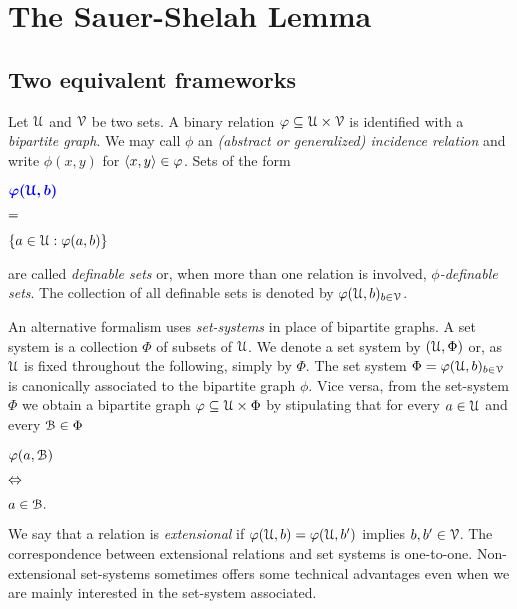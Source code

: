 \documentclass[sputnik.tex]{subfiles}
\begin{document}
\chapter{The Sauer-Shelah Lemma}
\label{sauer}

\def\vc{{\footnotesize VC}}
\def\nip{{\footnotesize NIP}}


\def\medrel#1{\parbox[t]{6ex}{$\displaystyle\hfil #1$}}
\def\ceq#1#2#3{\parbox[t]{25ex}{$\displaystyle #1$}\medrel{#2}{$\displaystyle #3$}}

\def\mr{\color{brown}}
\def\gr{\color{green}}

\def\separatore{\hfil o \rule[0.5ex]{4ex}{0.1ex} o \rule[0.5ex]{4ex}{0.1ex} o}

\section{Two equivalent frameworks}\label{vc_dimension}

Let $\EuScript U$ and $\EuScript V$ be two sets. 
A binary relation $\varphi\subseteq \EuScript U\times\EuScript V$ is identified with a \emph{bipartite graph}.
We may call $\phi$ an \emph{(abstract or generalized) incidence relation\/} and write $\phi(x,y)$ for $\langle x,y\rangle\in\varphi$.
Sets of the form

\ceq{\hfill\emph{$\phi(\U,b)$}}{=}{\{a\in\U:\phi(a,b)\}}

are called \emph{definable sets\/} or, when more than one relation is involved, \emph{$\phi$-definable sets}.
The collection of all definable sets is denoted by \emph{$\varphi(\EuScript U,b)_{b\in\EuScript V}$}.

An alternative formalism uses \emph{set-systems\/} in place of bipartite graphs.
A set system is a collection $\Phi$ of subsets of $\EuScript U$.
We denote a set system by \emph{$(\EuScript U,\Phi)$} or, as $\EuScript U$ is fixed throughout the following, simply by \emph{$\Phi$}.
The set system $\Phi=\varphi(\EuScript U,b)_{b\in\EuScript V}$ is canonically associated to the bipartite graph $\phi$.
Vice versa, from the set-system $\Phi$ we obtain a bipartite graph $\varphi\subseteq\EuScript U\times\Phi$ by stipulating that for every $a\in\EuScript U$ and every $\EuScript B\in\Phi$ 

\ceq{\hfill\phi(a,\B)}{\IFF}{a\in\B.}

We say that a relation is \emph{extensional\/} if $\varphi(\EuScript U,b)=\varphi(\EuScript U,b')$ implies $b,b'\in\EuScript V$.
The correspondence between extensional relations and set systems is one-to-one.
Non-extensional set-systems sometimes offers some technical advantages even when we are mainly interested in the set-system associated.
\end{document}
